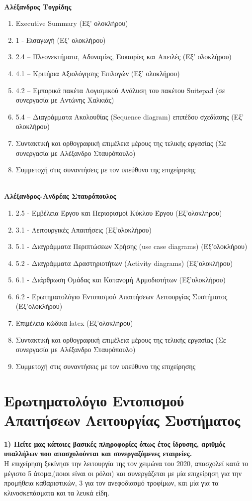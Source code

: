 \noindent
\\\textbf{Αλέξανδρος Τογρίδης}
\begin{enumerate}
	\item Εxecutive Summary (Εξ’ ολοκλήρου)
	\item 1 - Εισαγωγή (Εξ’ ολοκλήρου)
	\item 2.4 – Πλεονεκτήματα, Αδυναμίες, Ευκαιρίες και Απειλές (Εξ’ ολοκλήρου)
	\item 4.1 – Κριτήρια Αξιολόγησης Επιλογών (Εξ’ ολοκλήρου)
	\item 4.2 – Εμπορικά πακέτα Λογισμικού  Ανάλυση του πακέτου Suitepad (σε συνεργασία με Αντώνης Χαλκιάς)
	\item 5.4 – Διαγράμματα Ακολουθίας (Sequence diagram) επιπέδου σχεδίασης (Εξ’ ολοκλήρου)
	\item Συντακτική και ορθογραφική επιμέλεια μέρους της τελικής εργασίας (Σε συνεργασία με Αλέξανδρο Σταυρόπουλο)
	\item Συμμετοχή στις συναντήσεις με τον υπεύθυνο της επιχείρησης
\end{enumerate}

\noindent
\\\textbf{Αλέξανδρος-Ανδρέας Σταυρόπουλος}
\begin{enumerate}
	\item 2.5 - Εμβέλεια Έργου και Περιορισμοί Κύκλου Έργου (Εξ'ολοκλήρου)
	\item 3.1 - Λειτουργικές Απαιτήσεις (Εξ'ολοκλήρου)
	\item 5.1 - Διαγράμματα Περιπτώσεων Χρήσης (use case diagrams) (Εξ'ολοκλήρου)
	\item 5.2 - Διαγράμματα Δραστηριοτήτων (Activity diagrams) (Εξ'ολοκλήρου)
	\item 6.1 - Διάρθρωση Ομάδας και Κατανομή Αρμοδιοτήτων (Εξ'ολοκλήρου)
	\item 6.2 - Ερωτηματολόγιο Εντοπισμού Απαιτήσεων Λειτουργίας Συστήματος (Εξ'ολοκλήρου)
	\item Επιμέλεια κώδικα latex (Εξ'ολοκλήρου)
	\item Συντακτική και ορθογραφική επιμέλεια μέρους της τελικής εργασίας (Σε συνεργασία με Αλέξανδρο Σταυρόπουλο)
	\item Συμμετοχή στις συναντήσεις με τον υπεύθυνο της επιχείρησης
\end{enumerate}


\section{Ερωτηματολόγιο Εντοπισμού Απαιτήσεων Λειτουργίας Συστήματος}
\textbf{1) Πείτε μας κάποιες βασικές πληροφορίες όπως έτος ίδρυσης, αριθμός 
	υπαλλήλων που απασχολούνται και συνεργαζόμενες εταιρείες.} \\
\noindent
Η επιχείρηση ξεκίνησε την λειτουργία της τον χειμώνα του 2020, απασχολεί κατά 
το μέγιστο 5 άτομα,(ποιοι είναι οι ρόλοι) και συνεργάζεται με μία επιχείρηση
για την προμήθεια καθαριστικών, 3 για τον ανεφοδιασμό τροφίμων, και μία για 
τα κλινοσκεπάσματα και τα λευκά είδη. \\

